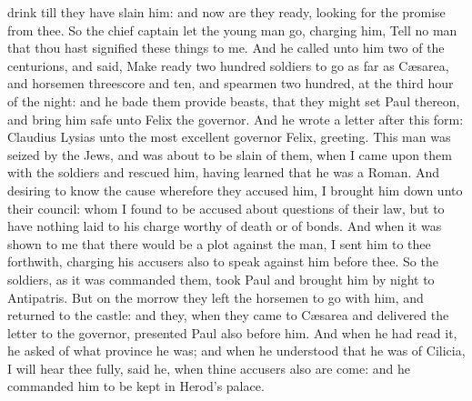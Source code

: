 drink till they have slain him: and now are they ready, looking for the promise from thee. So the chief captain let the young man go, charging him, Tell no man that thou hast signified these things to me. And he called unto him two of the centurions, and said, Make ready two hundred soldiers to go as far as Cæsarea, and horsemen threescore and ten, and spearmen two hundred, at the third hour of the night: and he bade them provide beasts, that they might set Paul thereon, and bring him safe unto Felix the governor. And he wrote a letter after this form:  Claudius Lysias unto the most excellent governor Felix, greeting. This man was seized by the Jews, and was about to be slain of them, when I came upon them with the soldiers and rescued him, having learned that he was a Roman. And desiring to know the cause wherefore they accused him, I brought him down unto their council: whom I found to be accused about questions of their law, but to have nothing laid to his charge worthy of death or of bonds. And when it was shown to me that there would be a plot against the man, I sent him to thee forthwith, charging his accusers also to speak against him before thee.  So the soldiers, as it was commanded them, took Paul and brought him by night to Antipatris. But on the morrow they left the horsemen to go with him, and returned to the castle: and they, when they came to Cæsarea and delivered the letter to the governor, presented Paul also before him. And when he had read it, he asked of what province he was; and when he understood that he was of Cilicia, I will hear thee fully, said he, when thine accusers also are come: and he commanded him to be kept in Herod’s palace. 

